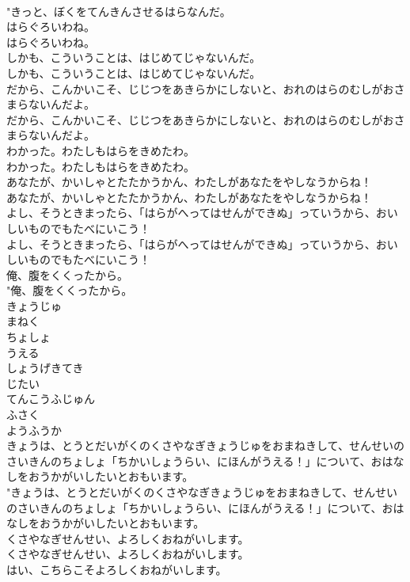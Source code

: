 \documentclass[8pt]{extreport}
\begin{document}
\begin{CJK}{UTF8}{min}
\\	"きっと、ぼくをてんきんさせるはらなんだ。 
\\	はらぐろいわね。	
\\	はらぐろいわね。 
\\	しかも、こういうことは、はじめてじゃないんだ。	
\\	しかも、こういうことは、はじめてじゃないんだ。 
\\	だから、こんかいこそ、じじつをあきらかにしないと、おれのはらのむしがおさまらないんだよ。	
\\	だから、こんかいこそ、じじつをあきらかにしないと、おれのはらのむしがおさまらないんだよ。 
\\	わかった。わたしもはらをきめたわ。	
\\	わかった。わたしもはらをきめたわ。 
\\	あなたが、かいしゃとたたかうかん、わたしがあなたをやしなうからね！	
\\	あなたが、かいしゃとたたかうかん、わたしがあなたをやしなうからね！ 
\\	よし、そうときまったら、「はらがへってはせんができぬ」っていうから、おいしいものでもたべにいこう！	
\\	よし、そうときまったら、「はらがへってはせんができぬ」っていうから、おいしいものでもたべにいこう！ 
\\	俺、腹をくくったから。	
\\	"俺、腹をくくったから。 
\\	きょうじゅ
\\	まねく
\\	ちょしょ
\\	うえる
\\	しょうげきてき
\\	じたい
\\	てんこうふじゅん
\\	ふさく
\\	ようふうか
\\	きょうは、とうとだいがくのくさやなぎきょうじゅをおまねきして、せんせいのさいきんのちょしょ「ちかいしょうらい、にほんがうえる！」について、おはなしをおうかがいしたいとおもいます。	
\\	"きょうは、とうとだいがくのくさやなぎきょうじゅをおまねきして、せんせいのさいきんのちょしょ「ちかいしょうらい、にほんがうえる！」について、おはなしをおうかがいしたいとおもいます。 
\\	くさやなぎせんせい、よろしくおねがいします。	
\\	くさやなぎせんせい、よろしくおねがいします。 
\\	はい、こちらこそよろしくおねがいします。	

\end{CJK}
\end{document}
